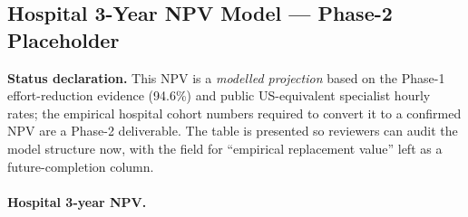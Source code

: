 \subsection{Hospital 3-Year NPV Model --- Phase-2 Placeholder}
\label{subsec:hospital_npv_phase2}

\noindent\textbf{Status declaration.} This NPV is a \emph{modelled
projection} based on the Phase-1 effort-reduction evidence (94.6\%) and
public US-equivalent specialist hourly rates; the empirical hospital
cohort numbers required to convert it to a confirmed NPV are a Phase-2
deliverable. The table is presented so reviewers can audit the model
structure now, with the field for ``empirical replacement value'' left
as a future-completion column.

\paragraph{Hospital 3-year NPV.}

